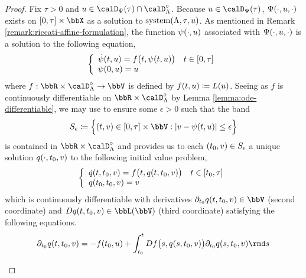 \begin{proof}
  \label{proof:proposition:momentSpace-facts}
  Fix $\tau > 0$ and $\momentVar \in \momentSpace(\tau) \cap \odeSpace^\circ$.
  Because $\momentVar \in \momentSpace(\tau)$, $\Psi(\cdot,u,\cdot)$ exists on $[0,\tau]\times\stateSpace$ as a solution to $\operatorname{system}(\Lambda,\tau,u)$.
  As mentioned in Remark \ref{remark:riccati-affine-formulation}, the function $\psi(\cdot,u)$ associated with $\Psi(\cdot,u,\cdot)$ is a solution to the following equation,
  \begin{equation}
    \label{eq:system'}
    \left\{\begin{array}{ll}
      \dot{\psi}(t,u) = f\big(t, \psi(t,u)\big) & t \in [0,\tau] \\
      \psi(0,u) = u
    \end{array}\right.
  \end{equation}
  where $f: \bbR \times \odeSpace^\circ \rightarrow \vecSpace$ is defined by $f(t, u) \coloneqq L(u)$.
  Seeing as $f$ is continuously differentiable on $\bbR \times \odeSpace^\circ$ by Lemma \ref{lemma:ode-differentiable}, we may use \cite[III.13 Theorem X]{walter1998} to ensure some $\epsilon > 0$ such that the band
  \begin{equation*}
    S_\epsilon \defeq \Big\{ (t, \vecVar) \in [0,\tau] \times \vecSpace : |\vecVar-\affPart(t,\momentVar)| \leq \epsilon \Big\}
  \end{equation*}
  is contained in $\bbR \times \odeSpace^\circ$ and provides us to each $(t_0, v) \in S_\epsilon$ a unique solution $q(\cdot,t_0,v)$ to the following initial value problem,
  \begin{equation*}
    \left\{\begin{array}{ll}
      \dot q(t,t_0,v) = f\big(t, q(t,t_0,v)\big) & t \in [t_0,\tau] \\
      q(t_0,t_0,v) = v
    \end{array}\right.
  \end{equation*}
  which is continuously differentiable with derivatives $\partial_{t_0} q(t,t_0,\vecVar) \in \vecSpace$ (second coordinate) and $Dq(t,t_0,\vecVar) \in \bbL(\vecSpace)$ (third coordinate) satisfying the following equations.
  \begin{align*}
    \partial_{t_0} q(t, t_0, \vecVar) 
    &= -f(t_0,\momentVar) + \int_{t_0}^t Df\big(s, q(s,t_0,\vecVar) \big) \partial_{t_0} q(s,t_0, \vecVar) \rmd s \\[0.5em]

\end{align*}
\end{proof}
